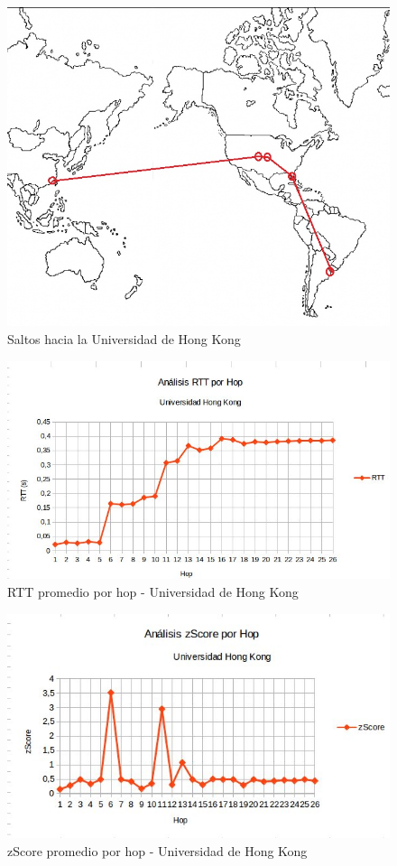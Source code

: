 \begin{figure}[H]
\centering
\includegraphics[width=1\textwidth]{graficos/mapa_HongKong.jpg}
\caption{Saltos hacia la Universidad de Hong Kong}
\label{hongkong_rtt}
\end{figure}


\begin{figure}[H]
\centering
\includegraphics[width=1\textwidth]{graficos/rTT_HongKong.jpg}
\caption{RTT promedio por hop - Universidad de Hong Kong}
\label{hongkong_rtt}
\end{figure}

\begin{figure}[H]
\centering
\includegraphics[width=1\textwidth]{graficos/zScore_HongKong.jpg}
\caption{zScore promedio por hop - Universidad de Hong Kong}
\label{hongkong_zs}
\end{figure}
